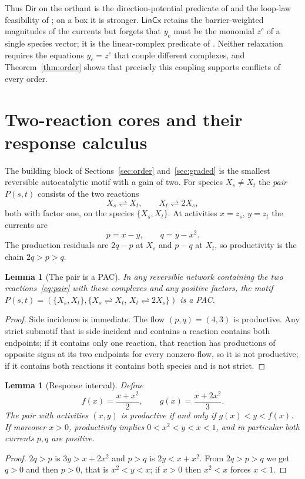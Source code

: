 \documentclass[11pt,a4paper]{article}
\theoremstyle{plain}
\newtheorem{lemma}[theorem]{Lemma}
\theoremstyle{definition}
\theoremstyle{remark}
\newcommand{\DIR}{\mathsf{Dir}}
\newcommand{\LIN}{\mathsf{LinCx}}
\newcommand{\rev}{\rightleftharpoons}
\begin{document}
Thus $\DIR$ on the orthant is the direction-potential predicate of \citep{tcic2026} and the loop-law feasibility of \citep{beard2004}; on a box it is stronger. $\LIN$ retains the barrier-weighted magnitudes of the currents but forgets that $y_c$ must be the monomial $z^c$ of a single species vector; it is the linear-complex predicate of \citep{tcic2026}. Neither relaxation requires the equations $y_c=z^c$ that couple different complexes, and Theorem~\ref{thm:order} shows that precisely this coupling supports conflicts of every order.

\section{Two-reaction cores and their response calculus}\label{sec:pairs}

The building block of Sections~\ref{sec:order} and~\ref{sec:graded} is the smallest reversible autocatalytic motif with a gain of two. For species $X_s\neq X_t$ the \emph{pair} $P(s,t)$ consists of the two reactions
\begin{equation}\label{eq:pair}
X_s\rev X_t,\qquad X_t\rev 2X_s,
\end{equation}
both with factor one, on the species $\{X_s,X_t\}$. At activities $x=z_s$, $y=z_t$ the currents are
\[
p=x-y,\qquad q=y-x^2 .
\]
The production residuals are $2q-p$ at $X_s$ and $p-q$ at $X_t$, so productivity is the chain $2q>p>q$.

\begin{lemma}[The pair is a PAC]\label{lem:pairPAC}
In any reversible network containing the two reactions~\eqref{eq:pair} with these complexes and any positive factors, the motif $P(s,t)=(\{X_s,X_t\},\{X_s\rev X_t,\,X_t\rev 2X_s\})$ is a PAC.
\end{lemma}
\begin{proof}
Side incidence is immediate. The flow $(p,q)=(4,3)$ is productive. Any strict submotif that is side-incident and contains a reaction contains both endpoints; if it contains only one reaction, that reaction has productions of opposite signs at its two endpoints for every nonzero flow, so it is not productive; if it contains both reactions it contains both species and is not strict.
\end{proof}

\begin{lemma}[Response interval]\label{lem:interval}
Define
\[
f(x)=\frac{x+x^2}{2},\qquad g(x)=\frac{x+2x^2}{3}.
\]
The pair with activities $(x,y)$ is productive if and only if $g(x)<y<f(x)$. If moreover $x>0$, productivity implies $0<x^2<y<x<1$, and in particular both currents $p,q$ are positive.
\end{lemma}
\begin{proof}
$2q>p$ is $3y>x+2x^2$ and $p>q$ is $2y<x+x^2$. From $2q>p>q$ we get $q>0$ and then $p>0$, that is $x^2<y<x$; if $x>0$ then $x^2<x$ forces $x<1$.
\end{proof}
\end{document}
